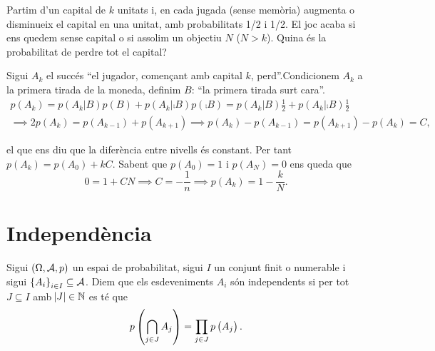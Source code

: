 \begin{problema}
    Partim d'un capital de $k$ unitats i, en cada jugada (sense memòria) augmenta o disminueix el capital en una unitat,
    amb probabilitats 1/2 i 1/2. El joc acaba si ens quedem sense capital o si assolim un objectiu $N$ ($N>k$).
    Quina és la probabilitat de perdre tot el capital?
\end{problema}
\begin{sol}
    Sigui $A_k$ el succés ``el jugador, començant amb capital $k$, perd''.Condicionem $A_k$ a la primera tirada de la moneda, 
    definim $B$: ``la primera tirada surt cara''.
    \begin{gather*}
      p(A_k) = p(A_k|B)p(B) + p(A_k|\comp{B})p(\comp{B}) = p(A_k|B)\frac{1}{2} + p(A_k|\comp{B})\frac{1}{2}\\
      \implies 2p(A_k)=p(A_{k-1}) + p(A_{k+1}) \implies p(A_k) - p(A_{k-1}) = p(A_{k+1}) - p(A_k) = C,
    \end{gather*}

    el que ens diu que la diferència entre nivells és constant. Per tant $p(A_k) = p(A_0)+kC$. Sabent que $p(A_0)=1$ i $p(A_N)=0$ ens queda que
    \[0 = 1 + CN \implies C = -\frac{1}{n} \implies p(A_k) = 1 - \frac{k}{N}.\]
\end{sol}


\section{Independència}

\begin{defi}
    Sigui $\left( \Omega, \mathcal{A}, p\right)$ un espai de probabilitat, sigui $I$ un conjunt finit o numerable i sigui $\left\{ A_i\right\}_{i\in I} \subseteq \mathcal{A}$. Diem que els esdeveniments $A_i$ són independents si per tot $J\subseteq I$ amb $\abs{J}\in\mathbb{N}$ es té que
    \[
        p\left(\bigcap_{j\in J} A_j\right) = \prod_{j\in J} p\left( A_j\right).
    \]
\end{defi}

\iffalse
\begin{example}
    \begin{enumerate}[1.]
        \item[]
        \item $\varnothing, \Omega$ són independents entre si.
        \item $A$ és independent amb si mateix si i només si $p\lp A\rp=1$ o $p\lp A\rp =0$.
    \end{enumerate}
\end{example}
\fi


